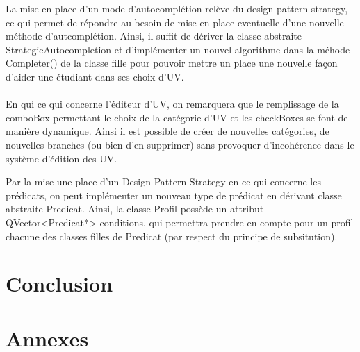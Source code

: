\documentclass[a4paper,10pt,french]{report}
\begin{document}
	La mise en place d'un mode d'autocomplétion relève du design pattern strategy, ce qui permet de répondre au besoin de mise en place eventuelle d'une nouvelle méthode d'autcomplétion.
	Ainsi, il suffit de dériver la classe abstraite StrategieAutocompletion et d'implémenter un nouvel algorithme dans la méhode Completer() de la classe fille pour pouvoir mettre un place une nouvelle façon d'aider une étudiant dans ses choix d'UV.\\\\
	
	En qui ce qui concerne l'éditeur d'UV, on remarquera que le remplissage de la comboBox permettant le choix de la catégorie d'UV et les checkBoxes se font de manière dynamique. Ainsi il est possible de créer de nouvelles catégories, de nouvelles branches (ou bien d'en supprimer) sans provoquer d'incohérence dans le système d'édition des UV.
	
    Par la mise une place d'un Design Pattern Strategy en ce qui concerne les prédicats, on peut implémenter un nouveau type de prédicat en dérivant classe abstraite Predicat.
    Ainsi, la classe Profil possède un attribut QVector<Predicat*> conditions, qui permettra prendre en compte pour un profil chacune des classes filles de Predicat (par respect du principe de subsitution).
    
	
	
	
	
	
\newpage			
\section*{Conclusion}\label{sec:Conclusion}







%
%

\appendix
\section*{Annexes}\label{sec:Annexes}
\end{document}
